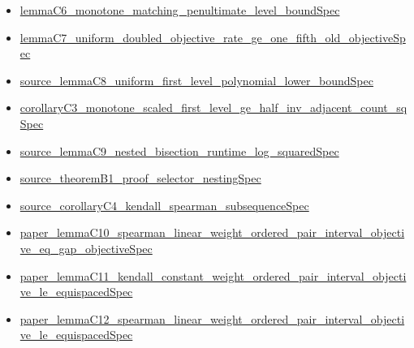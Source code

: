 \documentclass[10pt]{article}
\begin{document}
\begin{itemize}[leftmargin=1.2em]
\begin{itemize}[leftmargin=1.2em]
\item \hyperlink{source-claim-6e85310ac4deebe8}{lemma\allowbreak{}C6\_\allowbreak{}monotone\_\allowbreak{}matching\_\allowbreak{}penultimate\_\allowbreak{}level\_\allowbreak{}bound\allowbreak{}Spec}
\item \hyperlink{source-claim-2d8e50cd70ac2429}{lemma\allowbreak{}C7\_\allowbreak{}uniform\_\allowbreak{}doubled\_\allowbreak{}objective\_\allowbreak{}rate\_\allowbreak{}ge\_\allowbreak{}one\_\allowbreak{}fifth\_\allowbreak{}old\_\allowbreak{}objective\allowbreak{}Spec}
\item \hyperlink{source-claim-905297a638ebd8e0}{source\_\allowbreak{}lemma\allowbreak{}C8\_\allowbreak{}uniform\_\allowbreak{}first\_\allowbreak{}level\_\allowbreak{}polynomial\_\allowbreak{}lower\_\allowbreak{}bound\allowbreak{}Spec}
\item \hyperlink{source-claim-d7f37d83d608e4fa}{corollary\allowbreak{}C3\_\allowbreak{}monotone\_\allowbreak{}scaled\_\allowbreak{}first\_\allowbreak{}level\_\allowbreak{}ge\_\allowbreak{}half\_\allowbreak{}inv\_\allowbreak{}adjacent\_\allowbreak{}count\_\allowbreak{}sq\allowbreak{}Spec}
\item \hyperlink{source-claim-8cc85076f8ab0b2b}{source\_\allowbreak{}lemma\allowbreak{}C9\_\allowbreak{}nested\_\allowbreak{}bisection\_\allowbreak{}runtime\_\allowbreak{}log\_\allowbreak{}squared\allowbreak{}Spec}
\item \hyperlink{source-claim-51c42bc84b84361b}{source\_\allowbreak{}theorem\allowbreak{}B1\_\allowbreak{}proof\_\allowbreak{}selector\_\allowbreak{}nesting\allowbreak{}Spec}
\item \hyperlink{source-claim-b7febbacfb3801fa}{source\_\allowbreak{}corollary\allowbreak{}C4\_\allowbreak{}kendall\_\allowbreak{}spearman\_\allowbreak{}subsequence\allowbreak{}Spec}
\item \hyperlink{source-claim-3b01d7ad0b5d48f9}{paper\_\allowbreak{}lemma\allowbreak{}C10\_\allowbreak{}spearman\_\allowbreak{}linear\_\allowbreak{}weight\_\allowbreak{}ordered\_\allowbreak{}pair\_\allowbreak{}interval\_\allowbreak{}objective\_\allowbreak{}eq\_\allowbreak{}gap\_\allowbreak{}objective\allowbreak{}Spec}
\item \hyperlink{source-claim-75f334c9ed5f4c67}{paper\_\allowbreak{}lemma\allowbreak{}C11\_\allowbreak{}kendall\_\allowbreak{}constant\_\allowbreak{}weight\_\allowbreak{}ordered\_\allowbreak{}pair\_\allowbreak{}interval\_\allowbreak{}objective\_\allowbreak{}le\_\allowbreak{}equispaced\allowbreak{}Spec}
\item \hyperlink{source-claim-9e5abbd5563b8516}{paper\_\allowbreak{}lemma\allowbreak{}C12\_\allowbreak{}spearman\_\allowbreak{}linear\_\allowbreak{}weight\_\allowbreak{}ordered\_\allowbreak{}pair\_\allowbreak{}interval\_\allowbreak{}objective\_\allowbreak{}le\_\allowbreak{}equispaced\allowbreak{}Spec}
\end{itemize}
\end{itemize}
\end{document}

